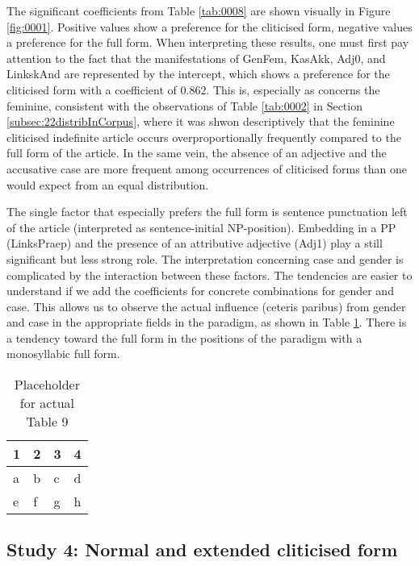The significant coefficients from Table \ref{tab:0008} are shown visually in Figure \ref{fig:0001}.
Positive values show a preference for the cliticised form, negative values a preference for the full form.
When interpreting these results, one must first pay attention to the fact that the manifestations of GenFem, KasAkk, Adj0, and LinkskAnd are represented by the intercept, which shows a preference for the cliticised form with a coefficient of 0.862.
This is, especially as concerns the feminine, consistent with the observations of Table \ref{tab:0002} in Section \ref{subsec:22distribInCorpus}, where it was shwon descriptively that the feminine cliticised indefinite article occurs overproportionally frequently compared to the full form of the article.
In the same vein, the absence of an adjective and the accusative case are more frequent among occurrences of cliticised forms than one would expect from an equal distribution.

The single factor that especially prefers the full form is sentence punctuation left of the article (interpreted as sentence-initial NP-position).
Embedding in a PP (LinksPraep) and the presence of an attributive adjective (Adj1) play a still significant but less strong role.
The interpretation concerning case and gender is complicated by the interaction between these factors.
The tendencies are easier to understand if we add the coefficients for concrete combinations for gender and case.
This allows us to observe the actual influence (ceteris paribus) from gender and case in the appropriate fields in the paradigm, as shown in Table \ref{tab:0009}.
There is a tendency toward the full form in the positions of the paradigm with a monosyllabic full form.

\begin{table}
	\centering
	\begin{tabular}{llll}
		\toprule
		\textbf{1} & \textbf{2} & \textbf{3} & \textbf{4} \\
		\midrule
		a & b & c & d \\
		e & f & g & h \\
		\bottomrule
	\end{tabular}
	\caption{Placeholder for actual Table 9}
	\label{tab:0009}
\end{table}

\subsection{Study 4: Normal and extended cliticised form}
\label{subsec:26s4NormExtendedCliticForm}

